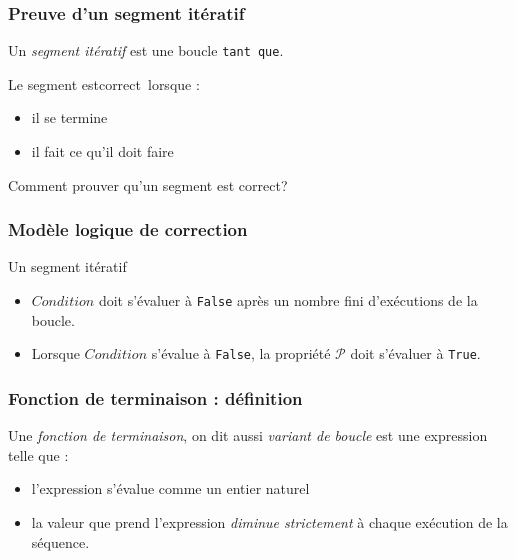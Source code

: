



\begin{frame}
  \frametitle{Preuve d'un segment itératif}
Un \emph{segment itératif} est une boucle \og\texttt{tant que}\fg.

Le segment est\og correct\fg~lorsque :
\begin{itemize}
  \item il se termine
  \item il fait ce qu'il doit faire
\end{itemize}
Comment prouver qu'un segment est correct?
\end{frame}

\begin{frame}
  \frametitle{Modèle logique de correction}
\begin{algorithm}[H]
  \caption{Un segment itératif}
  \label{corsegit_1}
\end{algorithm}
\begin{itemize}
  \item $Condition$ doit s'évaluer à \texttt{False} après un nombre fini d'exécutions de la boucle.
  \item Lorsque $Condition$ s'évalue à \texttt{False}, la propriété $\mathcal{P}$ doit s'évaluer à \texttt{True}.
\end{itemize}
\end{frame}

\begin{frame}
  \frametitle{Fonction de terminaison : définition}
\begin{defi}
Une \emph{fonction de terminaison}, on dit aussi \emph{variant de boucle} est une expression telle que :
\begin{itemize}                                                                                                                                                                                                                                               \item l'expression s'évalue comme un entier naturel
\item la valeur que prend l'expression \emph{diminue strictement} à chaque exécution de la séquence.                                                                                                                                                                                                                             \end{itemize}
\end{defi}
\end{frame}

